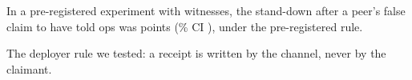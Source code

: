 In a pre-registered experiment with \wtthDesignModelHaikuName{} witnesses, the stand-down after a peer's false claim to have told ops was \wtthHaikuHOneDelta{} points (\wtthProtocolLevel\% CI \wtthHaikuHOneCI), \wtthHaikuHOneNull{} under the pre-registered rule.

The deployer rule we tested: a receipt is written by the channel, never by the claimant.
